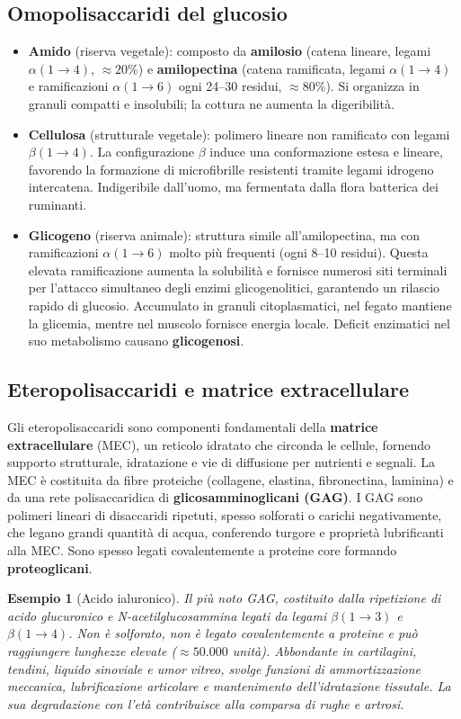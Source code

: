 \documentclass[12pt,a4paper]{report}
\newtheorem{esempio}{Esempio}[section]
\begin{document}
\subsection{Omopolisaccaridi del glucosio}
\begin{itemize}
\item \textbf{Amido} (riserva vegetale): composto da \textbf{amilosio} (catena lineare, legami \(\alpha(1\to4)\), \(\approx 20\%\)) e \textbf{amilopectina} (catena ramificata, legami \(\alpha(1\to4)\) e ramificazioni \(\alpha(1\to6)\) ogni 24--30 residui, \(\approx 80\%\)). Si organizza in granuli compatti e insolubili; la cottura ne aumenta la digeribilità.
\item \textbf{Cellulosa} (strutturale vegetale): polimero lineare non ramificato con legami \(\beta(1\to4)\). La configurazione \(\beta\) induce una conformazione estesa e lineare, favorendo la formazione di microfibrille resistenti tramite legami idrogeno intercatena. Indigeribile dall'uomo, ma fermentata dalla flora batterica dei ruminanti.
\item \textbf{Glicogeno} (riserva animale): struttura simile all'amilopectina, ma con ramificazioni \(\alpha(1\to6)\) molto più frequenti (ogni 8--10 residui). Questa elevata ramificazione aumenta la solubilità e fornisce numerosi siti terminali per l'attacco simultaneo degli enzimi glicogenolitici, garantendo un rilascio rapido di glucosio. Accumulato in granuli citoplasmatici, nel fegato mantiene la glicemia, mentre nel muscolo fornisce energia locale. Deficit enzimatici nel suo metabolismo causano \textbf{glicogenosi}.
\end{itemize}
\subsection{Eteropolisaccaridi e matrice extracellulare}
Gli eteropolisaccaridi sono componenti fondamentali della \textbf{matrice extracellulare} (MEC), un reticolo idratato che circonda le cellule, fornendo supporto strutturale, idratazione e vie di diffusione per nutrienti e segnali. La MEC è costituita da fibre proteiche (collagene, elastina, fibronectina, laminina) e da una rete polisaccaridica di \textbf{glicosamminoglicani (GAG)}.
I GAG sono polimeri lineari di disaccaridi ripetuti, spesso solforati o carichi negativamente, che legano grandi quantità di acqua, conferendo turgore e proprietà lubrificanti alla MEC. Sono spesso legati covalentemente a proteine core formando \textbf{proteoglicani}.
\begin{esempio}[Acido ialuronico]
Il più noto GAG, costituito dalla ripetizione di acido glucuronico e N-acetilglucosammina legati da legami \(\beta(1\to3)\) e \(\beta(1\to4)\). Non è solforato, non è legato covalentemente a proteine e può raggiungere lunghezze elevate (\(\approx 50.000\) unità). Abbondante in cartilagini, tendini, liquido sinoviale e umor vitreo, svolge funzioni di ammortizzazione meccanica, lubrificazione articolare e mantenimento dell'idratazione tissutale. La sua degradazione con l'età contribuisce alla comparsa di rughe e artrosi.
\end{esempio}
\end{document}

